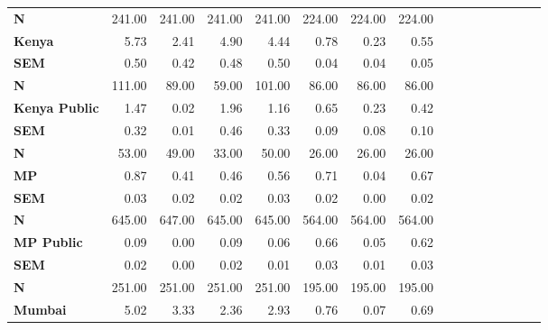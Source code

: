\begin{tabular}{@{\extracolsep{5pt}}lrrrrrrrrrrrrrrr}
{\bf N} & 241.00\phantom{***} & 241.00\phantom{***} & 241.00\phantom{***} & 241.00\phantom{***} & 224.00\phantom{***} & 224.00\phantom{***} & 224.00\phantom{***} \\
{\bf Kenya} & 5.73\phantom{***} & 2.41\phantom{***} & 4.90\phantom{***} & 4.44\phantom{***} & 0.78\phantom{***} & 0.23\phantom{***} & 0.55\phantom{***} \\
{\bf SEM} & 0.50\phantom{***} & 0.42\phantom{***} & 0.48\phantom{***} & 0.50\phantom{***} & 0.04\phantom{***} & 0.04\phantom{***} & 0.05\phantom{***} \\
{\bf N} & 111.00\phantom{***} & 89.00\phantom{***} & 59.00\phantom{***} & 101.00\phantom{***} & 86.00\phantom{***} & 86.00\phantom{***} & 86.00\phantom{***} \\
{\bf Kenya Public} & 1.47\phantom{***} & 0.02\phantom{***} & 1.96\phantom{***} & 1.16\phantom{***} & 0.65\phantom{***} & 0.23\phantom{***} & 0.42\phantom{***} \\
{\bf SEM} & 0.32\phantom{***} & 0.01\phantom{***} & 0.46\phantom{***} & 0.33\phantom{***} & 0.09\phantom{***} & 0.08\phantom{***} & 0.10\phantom{***} \\
{\bf N} & 53.00\phantom{***} & 49.00\phantom{***} & 33.00\phantom{***} & 50.00\phantom{***} & 26.00\phantom{***} & 26.00\phantom{***} & 26.00\phantom{***} \\
{\bf MP} & 0.87\phantom{***} & 0.41\phantom{***} & 0.46\phantom{***} & 0.56\phantom{***} & 0.71\phantom{***} & 0.04\phantom{***} & 0.67\phantom{***} \\
{\bf SEM} & 0.03\phantom{***} & 0.02\phantom{***} & 0.02\phantom{***} & 0.03\phantom{***} & 0.02\phantom{***} & 0.00\phantom{***} & 0.02\phantom{***} \\
{\bf N} & 645.00\phantom{***} & 647.00\phantom{***} & 645.00\phantom{***} & 645.00\phantom{***} & 564.00\phantom{***} & 564.00\phantom{***} & 564.00\phantom{***} \\
{\bf MP Public} & 0.09\phantom{***} & 0.00\phantom{***} & 0.09\phantom{***} & 0.06\phantom{***} & 0.66\phantom{***} & 0.05\phantom{***} & 0.62\phantom{***} \\
{\bf SEM} & 0.02\phantom{***} & 0.00\phantom{***} & 0.02\phantom{***} & 0.01\phantom{***} & 0.03\phantom{***} & 0.01\phantom{***} & 0.03\phantom{***} \\
{\bf N} & 251.00\phantom{***} & 251.00\phantom{***} & 251.00\phantom{***} & 251.00\phantom{***} & 195.00\phantom{***} & 195.00\phantom{***} & 195.00\phantom{***} \\
{\bf Mumbai} & 5.02\phantom{***} & 3.33\phantom{***} & 2.36\phantom{***} & 2.93\phantom{***} & 0.76\phantom{***} & 0.07\phantom{***} & 0.69\phantom{***} \\

\end{tabular}
